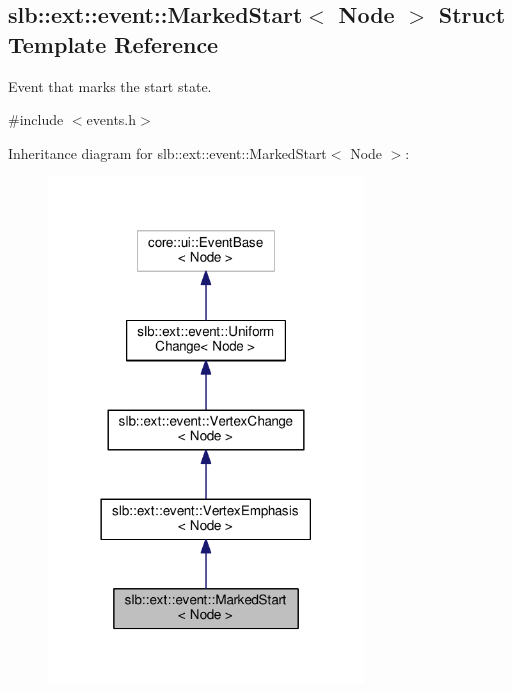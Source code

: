 \hypertarget{structslb_1_1ext_1_1event_1_1MarkedStart}{}\subsection{slb\+:\+:ext\+:\+:event\+:\+:Marked\+Start$<$ Node $>$ Struct Template Reference}
\label{structslb_1_1ext_1_1event_1_1MarkedStart}


Event that marks the start state.  




{\ttfamily \#include $<$events.\+h$>$}



Inheritance diagram for slb\+:\+:ext\+:\+:event\+:\+:Marked\+Start$<$ Node $>$\+:\nopagebreak
\begin{figure}[H]
\begin{center}
\leavevmode
\includegraphics[width=237pt]{structslb_1_1ext_1_1event_1_1MarkedStart__inherit__graph}
\end{center}
\end{figure}


